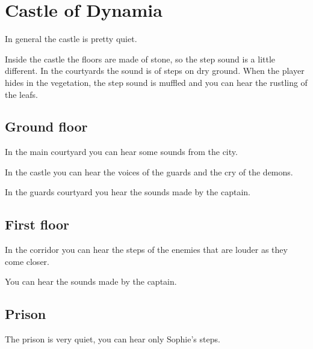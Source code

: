 \section{Castle of Dynamia}

In general the castle is pretty quiet.

Inside the castle the floors are made of stone, so the step sound is a little different. In the courtyards the sound is of steps on dry ground. When the player hides in the vegetation, the step sound is muffled and you can hear the rustling of the leafs.

\subsection{Ground floor}
In the main courtyard you can hear some sounds from the city.

In the castle you can hear the voices of the guards and the cry of the demons.

In the guards courtyard you hear the sounds made by the captain.

\subsection{First floor}
In the corridor you can hear the steps of the enemies that are louder as they come closer.

You can hear the sounds made by the captain.

\subsection{Prison}
The prison is very quiet, you can hear only Sophie's steps.
